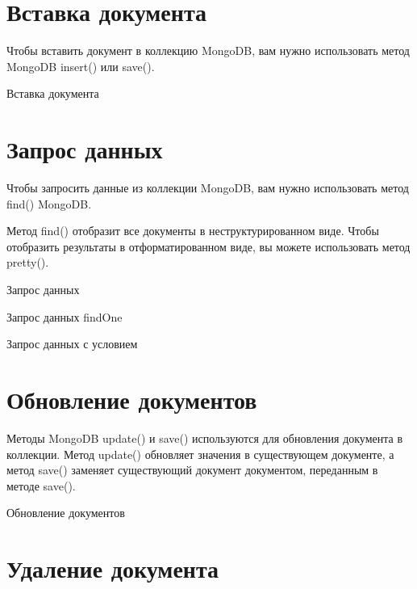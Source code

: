 \clearpage
\section{Вставка документа}

Чтобы вставить документ в коллекцию MongoDB, вам нужно
использовать метод MongoDB insert() или save().

\begin{image}
	\caption{Вставка документа}
	\label{fig:insert}
\end{image}

\clearpage
\section{Запрос данных}

Чтобы запросить данные из коллекции MongoDB, вам нужно
использовать метод find() MongoDB.\par
Метод find() отобразит все документы в неструктурированном виде.
Чтобы отобразить результаты в отформатированном виде, вы можете
использовать метод pretty().

\begin{image}
	\caption{Запрос данных}
	\label{fig:find}
\end{image}

\begin{image}
	\caption{Запрос данных findOne}
	\label{fig:find:one}
\end{image}

\begin{image}
	\caption{Запрос данных с условием}
	\label{fig:find:like}
\end{image}

\clearpage
\section{Обновление документов}

Методы MongoDB update() и save() используются для обновления
документа в коллекции. Метод update() обновляет значения в существующем
документе, а метод save() заменяет существующий документ документом,
переданным в методе save().

\begin{image}
	\caption{Обновление документов}
	\label{fig:update}
\end{image}

\clearpage
\section{Удаление документа}

